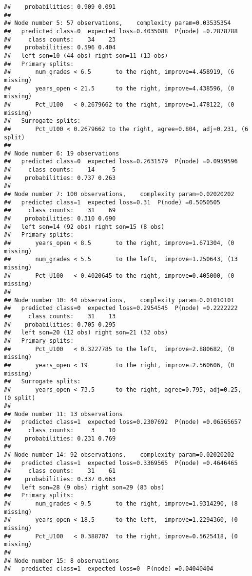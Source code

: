 \documentclass[
]{article}
\begin{document}
\begin{verbatim}
##    probabilities: 0.909 0.091 
## 
## Node number 5: 57 observations,    complexity param=0.03535354
##   predicted class=0  expected loss=0.4035088  P(node) =0.2878788
##     class counts:    34    23
##    probabilities: 0.596 0.404 
##   left son=10 (44 obs) right son=11 (13 obs)
##   Primary splits:
##       num_grades < 6.5       to the right, improve=4.458919, (6 missing)
##       years_open < 21.5      to the right, improve=4.438596, (0 missing)
##       Pct_U100   < 0.2679662 to the right, improve=1.478122, (0 missing)
##   Surrogate splits:
##       Pct_U100 < 0.2679662 to the right, agree=0.804, adj=0.231, (6 split)
## 
## Node number 6: 19 observations
##   predicted class=0  expected loss=0.2631579  P(node) =0.0959596
##     class counts:    14     5
##    probabilities: 0.737 0.263 
## 
## Node number 7: 100 observations,    complexity param=0.02020202
##   predicted class=1  expected loss=0.31  P(node) =0.5050505
##     class counts:    31    69
##    probabilities: 0.310 0.690 
##   left son=14 (92 obs) right son=15 (8 obs)
##   Primary splits:
##       years_open < 8.5       to the right, improve=1.671304, (0 missing)
##       num_grades < 5.5       to the left,  improve=1.250643, (13 missing)
##       Pct_U100   < 0.4020645 to the right, improve=0.405000, (0 missing)
## 
## Node number 10: 44 observations,    complexity param=0.01010101
##   predicted class=0  expected loss=0.2954545  P(node) =0.2222222
##     class counts:    31    13
##    probabilities: 0.705 0.295 
##   left son=20 (12 obs) right son=21 (32 obs)
##   Primary splits:
##       Pct_U100   < 0.3227785 to the left,  improve=2.880682, (0 missing)
##       years_open < 19        to the right, improve=2.560606, (0 missing)
##   Surrogate splits:
##       years_open < 73.5      to the right, agree=0.795, adj=0.25, (0 split)
## 
## Node number 11: 13 observations
##   predicted class=1  expected loss=0.2307692  P(node) =0.06565657
##     class counts:     3    10
##    probabilities: 0.231 0.769 
## 
## Node number 14: 92 observations,    complexity param=0.02020202
##   predicted class=1  expected loss=0.3369565  P(node) =0.4646465
##     class counts:    31    61
##    probabilities: 0.337 0.663 
##   left son=28 (9 obs) right son=29 (83 obs)
##   Primary splits:
##       num_grades < 9.5       to the right, improve=1.9314290, (8 missing)
##       years_open < 18.5      to the left,  improve=1.2294360, (0 missing)
##       Pct_U100   < 0.388707  to the right, improve=0.5625418, (0 missing)
## 
## Node number 15: 8 observations
##   predicted class=1  expected loss=0  P(node) =0.04040404

\end{verbatim}
\end{document}
